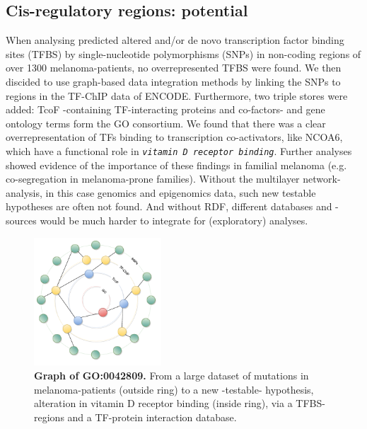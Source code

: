 \documentclass[twoside,fontsize=12pt]{article}
\begin{document}
\subsection*{Cis-regulatory regions: potential}
When analysing predicted altered and/or de novo transcription factor binding sites (TFBS) by single-nucleotide polymorphisms (SNPs) in non-coding regions of over 1300 melanoma-patients, no overrepresented TFBS were found. We then discided to use graph-based data integration methods by linking the SNPs to regions in the TF-ChIP data of ENCODE\cite{ENCODE}. Furthermore, two triple stores were added: TcoF\cite{Schaefer2011} -containing TF-interacting proteins and co-factors- and gene ontology terms form the GO consortium\cite{Ashburner2000}. We found that there was a clear overrepresentation of TFs binding to transcription co-activators, like NCOA6, which have a functional role in \emph{\lstinline|vitamin D receptor binding|}. Further analyses showed  evidence of the importance of these findings in familial melanoma (e.g. co-segregation in melanoma-prone families). Without the multilayer network-analysis, in this case genomics and epigenomics data, such new testable hypotheses are often not found. And without RDF, different databases and -sources would be much harder to integrate for (exploratory) analyses. 
\begin{figure}[H]
    \centering
    \includegraphics[width=0.425\textwidth]{rondjeGraphs.pdf}
    \caption{\textbf{Graph of GO:0042809.} From a large dataset of mutations in melanoma-patients (outside ring) to a new -testable- hypothesis, alteration in vitamin D receptor binding (inside ring), via a TFBS-regions and a TF-protein interaction database.}
    \label{fig:mela}
\end{figure}
\end{document}
